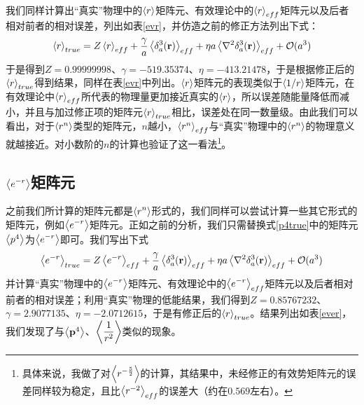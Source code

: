 \documentclass[cs4size,titlepage,twoside]{ctexart}
\begin{document}
我们同样计算出“真实”物理中的$\displaystyle\expval{r}$矩阵元、有效理论中的$\displaystyle\expval{r}_{eff}$矩阵元以及后者相对前者的相对误差，列出如表\ref{evr}，并仿造之前的修正方法列出下式：
\begin{equation}\label{rt}
	\expval{r}_{true}=Z\expval{r}_{eff}+\frac{\gamma}{a}\expval{\delta^3_a(\vb{r})}_{eff}+\eta a\expval{\laplacian{\delta^3_a(\vb{r})}}_{eff}+\mathcal{O}(a^3)
\end{equation}
于是得到$Z=0.99999998$、$\gamma=-519.35374$、$\eta=-413.21478$，于是根据修正后的$\expval{r}_{true}$得到结果，同样在表\ref{evr}中列出。$\displaystyle\expval{r}$矩阵元的表现类似于$\displaystyle\expval{1/r}$矩阵元，在有效理论中$\displaystyle\expval{r}_{eff}$所代表的物理量更加接近真实的$\displaystyle\expval{r}$，所以误差随能量降低而减小，并且与加过修正项的矩阵元$\expval{r}_{true}$相比，误差处在同一数量级。由此我们可以看出，对于$\expval{r^n}$类型的矩阵元，$n$越小，$\expval{r^n}_{eff}$与“真实”物理中的$\expval{r^n}$的物理意义就越接近。对小数阶的$n$的计算也验证了这一看法\footnote{具体来说，我做了对$\expval{r^{-\frac{5}{2}}}$的计算，其结果中，未经修正的有效势矩阵元的误差同样较为稳定，且比$\expval{r^{-2}}_{eff}$的误差大（约在$0.569$左右）。}。
\subsection{$\displaystyle\expval{e^{-r}}$矩阵元}

之前我们所计算的矩阵元都是$\displaystyle\expval{r^{n}}$形式的，我们同样可以尝试计算一些其它形式的矩阵元，例如$\displaystyle\expval{e^{-r}}$矩阵元。正如之前的分析，我们只需替换式\eqref{p4true}中的矩阵元$\expval{p^4}$为$\displaystyle\expval{e^{-r}}$即可。我们写出下式
\begin{equation}\label{ert}
	\expval{e^{-r}}_{true}=Z\expval{e^{-r}}_{eff}+\frac{\gamma}{a}\expval{\delta^3_a(\vb{r})}_{eff}+\eta a\expval{\laplacian{\delta^3_a(\vb{r})}}_{eff}+\mathcal{O}(a^3)
\end{equation}
并计算“真实”物理中的$\displaystyle\expval{e^{-r}}$矩阵元、有效理论中的$\displaystyle\expval{e^{-r}}_{eff}$矩阵元以及后者相对前者的相对误差；利用“真实”物理的低能结果，我们得到$Z=0.85767232$、$\gamma=2.9077135$、$\eta=-2.0712615$，于是有修正后的$\expval{r}_{true}$。结果列出如表\ref{ever}，我们发现了与$\expval{\vb{p}^4}$、$\displaystyle\expval{\frac{1}{r^2}}$类似的现象。
\end{document}
